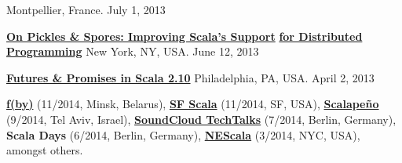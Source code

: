 \documentclass[9pt]{article}
\begin{document}
 
\linebreak\noindent Montpellier, France. July 1, 2013
\bigskip

\noindent\href{https://speakerdeck.com/heathermiller/on-pickles-and-spores-improving-support-for-distributed-programming-in-scala}{\bf On Pickles \& Spores: Improving Scala's Support} \vspace{-0.03in}
\linebreak\noindent\href{https://speakerdeck.com/heathermiller/on-pickles-and-spores-improving-support-for-distributed-programming-in-scala}{\bf for Distributed Programming}\dates{}
\linebreak\noindent New York, NY, USA. June 12, 2013
\bigskip

\noindent\href{http://lampwww.epfl.ch/~hmiller/files/Futures-Try-PhillyETE.pdf}{\bf Futures \& Promises in Scala 2.10} 
\linebreak\noindent Philadelphia, PA, USA. April 2, 2013
\bigskip

\bigskip
{}
\vspace{0.3em}
\newline\noindent
{\bf\href{http://fby.by/}{f(by)}} (11/2014, Minsk, Belarus),
{\bf\href{https://www.youtube.com/watch?v=4obTnLVXQWY}{SF Scala}} (11/2014, SF, USA),
{\bf\href{http://www.scalapeno.org.il/#!heather-miller/cj0q}{Scalape\~{n}o}} (9/2014, Tel Aviv, Israel),
{\bf \href{https://www.eventbrite.com/e/soundcloud-techtalks-unconventional-thinking-in-design-and-programming-tickets-12166429117}{SoundCloud TechTalks}} (7/2014, Berlin, Germany),
{\bf Scala Days} (6/2014, Berlin, Germany),
{\bf\href{http://www.nescala.org/2014}{NEScala}} (3/2014, NYC, USA), amongst others.

\bigskip



\end{document}
